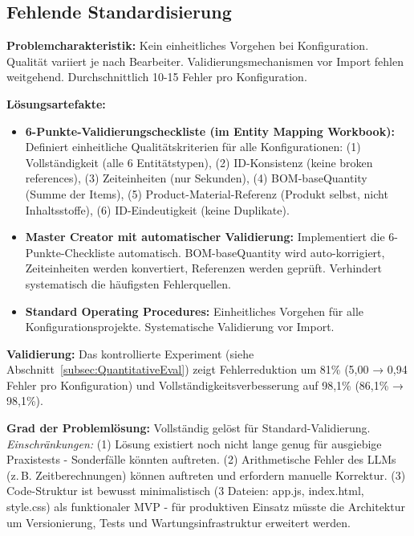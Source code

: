 \subsection{Fehlende Standardisierung}
\label{subsec:StandardisierungEval}

\textbf{Problemcharakteristik:} Kein einheitliches Vorgehen bei Konfiguration. Qualität variiert je nach Bearbeiter. Validierungsmechanismen vor Import fehlen weitgehend. Durchschnittlich 10-15 Fehler pro Konfiguration.

\noindent \textbf{Lösungsartefakte:}

\begin{itemize}
    \item \textbf{6-Punkte-Validierungscheckliste (im Entity Mapping Workbook):} Definiert einheitliche Qualitätskriterien für alle Konfigurationen: (1) Vollständigkeit (alle 6 Entitätstypen), (2) ID-Konsistenz (keine broken references), (3) Zeiteinheiten (nur Sekunden), (4) BOM-baseQuantity (Summe der Items), (5) Product-Material-Referenz (Produkt selbst, nicht Inhaltsstoffe), (6) ID-Eindeutigkeit (keine Duplikate).

    \item \textbf{Master Creator mit automatischer Validierung:} Implementiert die 6-Punkte-Checkliste automatisch. BOM-baseQuantity wird auto-korrigiert, Zeiteinheiten werden konvertiert, Referenzen werden geprüft. Verhindert systematisch die häufigsten Fehlerquellen.

    \item \textbf{Standard Operating Procedures:} Einheitliches Vorgehen für alle Konfigurationsprojekte. Systematische Validierung vor Import.
\end{itemize}

\noindent \textbf{Validierung:} Das kontrollierte Experiment (siehe Abschnitt~\ref{subsec:QuantitativeEval}) zeigt Fehlerreduktion um 81\% (5,00 → 0,94 Fehler pro Konfiguration) und Vollständigkeitsverbesserung auf 98,1\% (86,1\% → 98,1\%).

\noindent \textbf{Grad der Problemlösung:} Vollständig gelöst für Standard-Validierung. \textit{Einschränkungen:} (1) Lösung existiert noch nicht lange genug für ausgiebige Praxistests - Sonderfälle könnten auftreten. (2) Arithmetische Fehler des LLMs (z.\,B. Zeitberechnungen) können auftreten und erfordern manuelle Korrektur. (3) Code-Struktur ist bewusst minimalistisch (3 Dateien: app.js, index.html, style.css) als funktionaler MVP - für produktiven Einsatz müsste die Architektur um Versionierung, Tests und Wartungsinfrastruktur erweitert werden.


